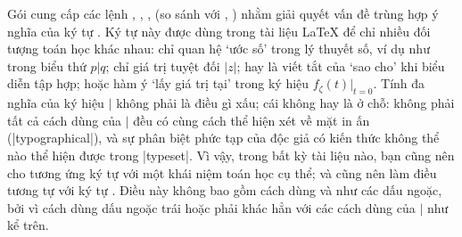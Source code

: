 Gói  cung cấp các lệnh , ,
,  (so sánh với , ) nhằm
giải quyết vấn đề trùng hợp ý nghĩa của ký tự \qc{\|}.
Ký tự này được dùng trong tài liệu \LaTeX{} để chỉ nhiều đối tượng
toán học khác nhau: chỉ quan hệ `ước số' trong lý thuyết số, ví dụ như
trong biểu thứ $p\vert q$; chỉ giá trị tuyệt đối $\lvert z\rvert$; hay
là viết tắt của `sao cho' khi biểu diễn tập hợp; hoặc hàm ý `lấy giá trị tại'
trong ký hiệu $f_\zeta(t)\bigr\rvert_{t=0}$.
Tính đa nghĩa của ký hiệu $\vert$ không phải là điều gì xấu; cái không
hay là ở chỗ: không phải tất cả cách dùng của $\vert$ đều có cùng cách thể hiện
xét về mặt in ấn (|typographical|), và sự phân biệt phức tạp của độc giả
có kiến thức không thể nào thể hiện được trong |typeset|.
Vì vậy, trong bất kỳ tài liệu nào, bạn cũng nên cho tương ứng ký tự \qc{\|}
với một khái niệm toán học cụ thể; và cũng nên làm điều tương tự với ký tự
\cn{\|}.
Điều này không bao gồm cách dùng \qc{|} và \ncn{\|}
như các dấu ngoặc, bởi vì cách dùng dấu ngoặc trái hoặc phải khác hẳn với
các cách dùng của $\vert$ như kể trên.


